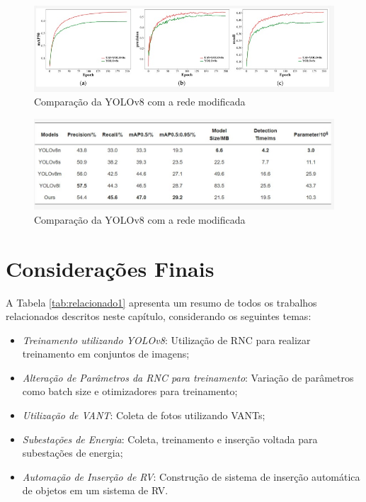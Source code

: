 \begin{figure}[!h]
    \center
    \begin{minipage}{0.9\linewidth}
        \center
        \captionsetup{justification=centering,margin=0.5cm,font=small}
        \includegraphics[width=0.7\linewidth]{img/cap3/chines.jpeg}
        \caption{Comparação da YOLOv8 com a rede modificada}
        \label{fig:chines}
    \end{minipage}
\end{figure}

\begin{figure}[!h]
    \center
    \begin{minipage}{0.9\linewidth}
        \center
        \captionsetup{justification=centering,margin=0.5cm,font=small}
        \includegraphics[width=0.7\linewidth]{img/cap3/chines-tabela.jpeg}
        \caption{Comparação da YOLOv8 com a rede modificada}
        \label{fig:chines-tabela}
    \end{minipage}
\end{figure}

\section{Considerações Finais}

A Tabela \ref{tab:relacionado1} apresenta um resumo de todos os trabalhos relacionados descritos neste capítulo, considerando os seguintes temas:

\begin{itemize}
    \item \textit{Treinamento utilizando YOLOv8}: Utilização de RNC para realizar treinamento em conjuntos de imagens;
    \item \textit{Alteração de Parâmetros da RNC para treinamento}: Variação de parâmetros como batch size e otimizadores para treinamento;
    \item \textit{Utilização de VANT}: Coleta de fotos utilizando VANTs;
    \item \textit{Subestações de Energia}: Coleta, treinamento e inserção voltada para subestações de energia;
    \item \textit{Automação de Inserção de RV}: Construção de sistema de inserção automática de objetos em um sistema de RV.
\end{itemize}

